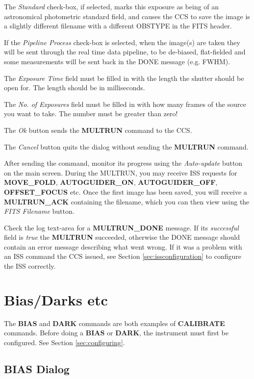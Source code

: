 \documentclass[10pt,a4paper]{article}
\begin{document}
The {\em Standard} check-box, if selected, marks this exposure as being of an astronomical photometric standard field, 
and causes the CCS to save the image is a slightly different filename with a different OBSTYPE in the FITS header.

If the {\em Pipeline Process} check-box is selected, when the image(s) are taken they will be sent through the 
real time data pipeline, to be de-biased, flat-fielded and some measurements will be sent back in the DONE message
(e.g. FWHM).

The {\em Exposure Time} field must be filled in with the length the shutter should be open for. The length should
be in milliseconds.

The {\em No. of Exposures} field must be filled in with how many frames of the source you want to take. The number
must be greater than zero!

The {\em Ok} button sends the {\bf MULTRUN} command to the CCS.

The {\em Cancel} button quits the dialog without sending the {\bf MULTRUN} command.

After sending the command, monitor its progress using the {\em Auto-update} button on the main screen. 
During the MULTRUN, you may receive ISS requests for {\bf MOVE\_FOLD}, {\bf AUTOGUIDER\_ON}, {\bf AUTOGUIDER\_OFF},
{\bf OFFSET\_FOCUS} etc. Once the first image has been saved, you will receive a {\bf MULTRUN\_ACK} containing
the filename, which you can then view using the {\em FITS Filename} button. 

Check the log text-area for a {\bf MULTRUN\_DONE} message. If its {\em successful} field is {\em true} the 
{\bf MULTRUN} succeeded, otherwise the DONE message should contain an error message describing what went wrong. 
If it was a problem with an ISS command the CCS issued, see Section \ref{sec:issconfiguration} to configure
the ISS correctly.

\section{Bias/Darks etc}

The {\bf BIAS} and {\bf DARK} commands are both examples of {\bf CALIBRATE} commands. 
Before doing a {\bf BIAS} or {\bf DARK}, the instrument must first be configured. See Section \ref{sec:configuring}.

\subsection{BIAS Dialog}
\end{document}
